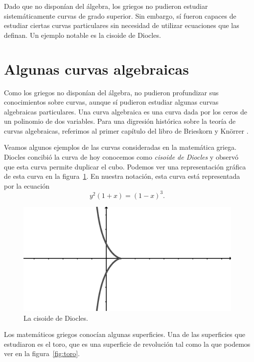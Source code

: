 
Dado que no disponían del álgebra, los griegos no
pudieron estudiar sistemáticamente curvas de grado superior. Sin embargo, sí
fueron capaces de estudiar ciertas curvas particulares sin necesidad de
utilizar ecuaciones que las definan. Un ejemplo notable es la cisoide de
Diocles. 

\section*{Algunas curvas algebraicas}

Como los griegos no disponían del álgebra, no pudieron profundizar sus
conocimientos sobre curvas, aunque sí pudieron estudiar algunas curvas
algebraicas particulares. Una curva algebraica es una curva dada por los ceros
de un polinomio de dos variables.  Para una digresión histórica sobre la teoría
de curvas algebraicas, referimos al primer capítulo del libro de Brieskorn y
Kn\"{o}rrer \cite{MR2975988}.

Veamos algunos ejemplos de las curvas consideradas en la matemática griega. 
Diocles concibió la curva de hoy conocemos como \emph{cisoide de Diocles} y observó que
esta curva permite duplicar el cubo. Podemos ver una representación gráfica de
esta curva en la figura~\ref{fig:cisoide}. En nuestra notación, esta curva
está representada por la ecuación
\[
	y^2(1+x)=(1-x)^3.
\]

\begin{figure}
   \centering
   \includegraphics[scale=0.3]{images/cisoide}
   \caption{La cisoide de Diocles.}
   \label{fig:cisoide}
\end{figure}

Los matemáticos griegos conocían algunas superficies. Una de las superficies
que estudiaron es el toro, que es una superficie de revolución tal como la que
podemos ver en la figura~\ref{fig:toro}. 

